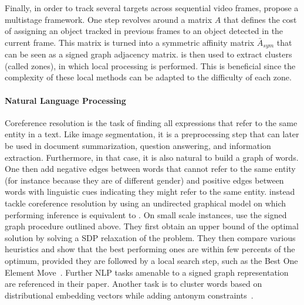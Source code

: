       Finally, in order to track several targets across sequential video frames,
      \textcite{multiTracking15} propose a multistage framework. One step revolves around a matrix
      $A$ that defines the cost of assigning an object tracked in previous frames to an object
      detected in the current frame. This matrix is turned into a symmetric affinity matrix
      $\bar{A}_{sym}$ that can be seen as a signed graph adjacency matrix. \pcc{} is then used to extract clusters
      (called zones), in which local processing is performed. This is beneficial since the
      complexity of these local methods can be adapted to the difficulty of each zone.

      \paragraph{Natural Language Processing} 
      Coreference resolution is the task of finding all expressions that refer to the same entity in
      a text. Like image segmentation, it is a preprocessing step that can later be used in document
      summarization, question answering, and information extraction. Furthermore, in that case, it
      is also natural to build a graph of words. One then add negative edges between words that
      cannot refer to the same entity (for instance because they are of different gender) and
      positive edges between words with linguistic cues indicating they might refer to the same
      entity. 
      \Textcite[Section
      2.3]{graphicalCoreference04} instead tackle coreference resolution by using an undirected graphical
      model on which performing inference is equivalent to \pcc{}. On small scale instances,
      \textcite{Elsner2009} use the signed graph procedure outlined above. They first obtain an
      upper bound of the optimal solution by solving a SDP
      relaxation of the problem. They then compare various heuristics and show that the best performing
      ones are within few percents of the optimum, provided they are followed by a local search
      step, such as the Best One Element Move~\autocite{Gionis2007}. Further NLP tasks amenable to
      a signed graph representation are referenced in their paper. Another task is
      to cluster words based on distributional embedding vectors while adding antonym
      constraints~\autocite{SignedWordRatings}.

